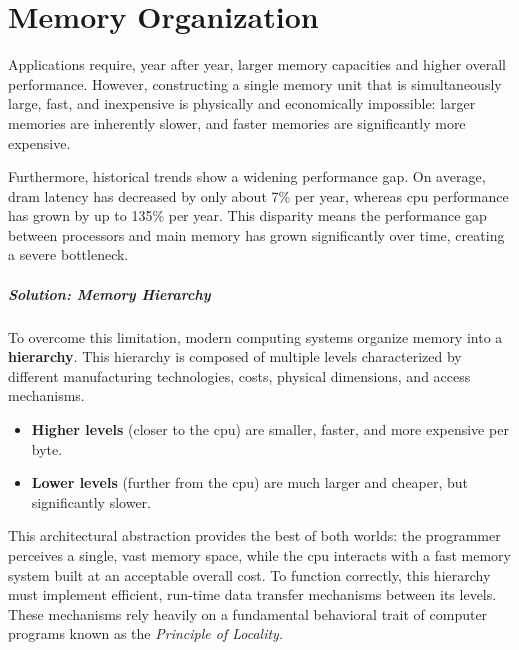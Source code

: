 \chapter{Memory Organization}

Applications require, year after year, larger memory capacities and higher overall performance. However, constructing a single memory unit that is simultaneously large, fast, and inexpensive is physically and economically impossible: larger memories are inherently slower, and faster memories are significantly more expensive. 

Furthermore, historical trends show a widening performance gap. On average, \gls{dram} latency has decreased by only about 7\% per year, whereas \gls{cpu} performance has grown by up to 135\% per year. This disparity means the performance gap between processors and main memory has grown significantly over time, creating a severe bottleneck.

\paragraph{Solution: Memory Hierarchy}
To overcome this limitation, modern computing systems organize memory into a \textbf{hierarchy}. This hierarchy is composed of multiple levels characterized by different manufacturing technologies, costs, physical dimensions, and access mechanisms. 

\begin{itemize}
    \item \textbf{Higher levels} (closer to the \gls{cpu}) are smaller, faster, and more expensive per byte.
    \item \textbf{Lower levels} (further from the \gls{cpu}) are much larger and cheaper, but significantly slower.
\end{itemize}

This architectural abstraction provides the best of both worlds: the programmer perceives a single, vast memory space, while the \gls{cpu} interacts with a fast memory system built at an acceptable overall cost. To function correctly, this hierarchy must implement efficient, run-time data transfer mechanisms between its levels. These mechanisms rely heavily on a fundamental behavioral trait of computer programs known as the \textit{Principle of Locality}.

